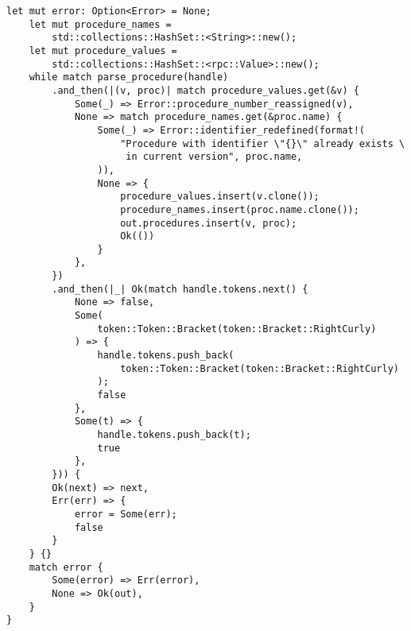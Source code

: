 \clearpage
\begin{lstlisting}[caption={Разбор версии (часть 3)}, label={lst:rust_parser_version3}]
    let mut error: Option<Error> = None;
    let mut procedure_names =
        std::collections::HashSet::<String>::new();
    let mut procedure_values =
        std::collections::HashSet::<rpc::Value>::new();
    while match parse_procedure(handle)
        .and_then(|(v, proc)| match procedure_values.get(&v) {
            Some(_) => Error::procedure_number_reassigned(v),
            None => match procedure_names.get(&proc.name) {
                Some(_) => Error::identifier_redefined(format!(
                    "Procedure with identifier \"{}\" already exists \
                     in current version", proc.name,
                )),
                None => {
                    procedure_values.insert(v.clone());
                    procedure_names.insert(proc.name.clone());
                    out.procedures.insert(v, proc);
                    Ok(())
                }
            },
        })
        .and_then(|_| Ok(match handle.tokens.next() {
            None => false,
            Some(
                token::Token::Bracket(token::Bracket::RightCurly)
            ) => {
                handle.tokens.push_back(
                    token::Token::Bracket(token::Bracket::RightCurly)
                );
                false
            },
            Some(t) => {
                handle.tokens.push_back(t);
                true
            },
        })) {
        Ok(next) => next,
        Err(err) => {
            error = Some(err);
            false
        }
    } {}
    match error {
        Some(error) => Err(error),
        None => Ok(out),
    }
}
\end{lstlisting}

